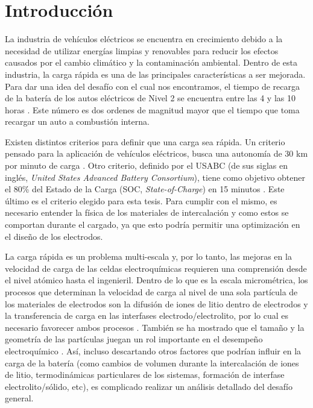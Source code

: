 \section{Introducción}

La industria de vehículos eléctricos se encuentra en crecimiento debido a la
necesidad de utilizar energías limpias y renovables para reducir los efectos 
causados por el cambio climático y la contaminación ambiental. Dentro de esta 
industria, la carga rápida es una de las principales características a ser 
mejorada. Para dar una idea del desafío con el cual nos encontramos, el tiempo 
de recarga de la batería de los autos eléctricos de Nivel 2 se encuentra entre 
las 4 y las 10 horas \cite{evcs}. Este número es dos ordenes de magnitud 
mayor que el tiempo que toma recargar un auto a combustión interna.

Existen distintos criterios para definir que una carga sea rápida. Un criterio 
pensado para la aplicación de vehículos eléctricos, busca una autonomía de 30 km 
por minuto de carga \cite{dufek2022}. Otro criterio, definido por el USABC (de sus
siglas en inglés, \textit{United States Advanced Battery Consortium}), tiene como
objetivo obtener el 80\% del Estado de la Carga (SOC, \textit{State-of-Charge})
en 15 minutos \cite{USABC}. Este último es el criterio elegido para esta tesis.
Para cumplir con el mismo, es necesario entender la física de los materiales de
intercalación y como estos se comportan durante el cargado, ya que esto podría 
permitir una optimización en el diseño de los electrodos.

La carga rápida es un problema multi-escala \cite{franco2013, franco2019} y, por 
lo tanto, las mejoras en la velocidad de carga de las celdas electroquímicas 
requieren una comprensión desde el nivel atómico hasta el ingenieril. Dentro 
de lo que es la escala micrométrica, los procesos que determinan la velocidad de 
carga al nivel de una sola partícula de los materiales de electrodos son la 
difusión de iones de litio dentro de electrodos y la transferencia de carga en 
las interfases electrodo/electrolito, por lo cual es necesario favorecer ambos
procesos \cite{liu2019, tomaszewska2019, weiss2021}. También se ha mostrado
que el tamaño y la geometría de las partículas juegan un rol importante en el 
desempeño electroquímico \cite{gavilan2020, gavilan2022}. Así, incluso descartando
otros factores que podrían influir en la carga de la batería (como cambios de 
volumen durante la intercalación de iones de litio, termodinámicas particulares
de los sistemas, formación de interfase electrolito/sólido, etc), es complicado
realizar un análisis detallado del desafío general.

